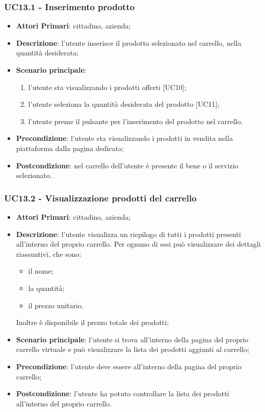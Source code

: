  \subsubsection{UC13.1 - Inserimento prodotto}
\begin{itemize}
	\item \textbf{Attori Primari}: cittadino, azienda;
	\item \textbf{Descrizione}: l'utente inserisce il prodotto selezionato nel carrello, nella quantità desiderata;
	\item \textbf{Scenario principale}:
	\begin{enumerate}[label=\alph*.]
		\item l'utente sta visualizzando i prodotti offerti [UC10];
		\item l'utente seleziona la quantità desiderata del prodotto [UC11];
		\item l'utente preme il pulsante per l'inserimento del prodotto nel carrello.
	\end{enumerate}
	\item \textbf{Precondizione}: l'utente sta visualizzando i prodotti in vendita nella piattaforma dalla pagina dedicata;
	\item \textbf{Postcondizione}: nel carrello dell'utente è presente il bene o il servizio selezionato.
\end{itemize}
\subsubsection{UC13.2 - Visualizzazione prodotti del carrello}
\begin{itemize}
	\item \textbf{Attori Primari}: cittadino, azienda;
	\item \textbf{Descrizione}: l'utente visualizza un riepilogo di tutti i prodotti presenti all'interno del proprio carrello. Per ognuno di essi può visualizzare dei dettagli riassuntivi, che sono:
	\begin{itemize}
		\item il nome;
		\item la quantità;
		\item il prezzo unitario.
	\end{itemize}
	Inoltre è disponibile il prezzo totale dei prodotti;

	\item \textbf{Scenario principale}: l'utente si trova all'interno della pagina del proprio carrello virtuale e può visualizzare la lista dei prodotti aggiunti al carrello;
	\item \textbf{Precondizione}: l'utente deve essere all'interno della pagina del proprio carrello;
	\item \textbf{Postcondizione}: l'utente ha potuto controllare la lista dei prodotti all'interno del proprio carrello.
\end{itemize}

